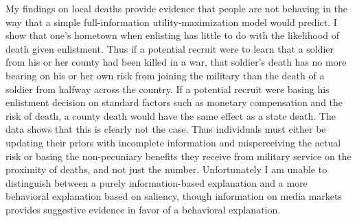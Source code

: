 \documentclass[12pt] {article}
\begin{document}


 

My findings on local deaths provide evidence that people
are not behaving in the way that a simple full-information utility-maximization
model would predict. I show that one's hometown when enlisting has
little to do with the likelihood of death given enlistment. Thus if
a potential recruit were to learn that a soldier from his or her
county had been killed in a war, that soldier's death has no more
bearing on his or her own risk from joining the military than the
death of a soldier from halfway across the country. If a potential
recruit were basing his enlistment decision on standard factors such
as monetary compensation and the risk of death, a county death would
have the same effect as a state death. The data shows that this is
clearly not the case. Thus individuals must either be updating their
priors with incomplete information and misperceiving the actual risk
or basing the non-pecuniary benefits they receive from military service
on the proximity of deaths, and not just the number. Unfortunately I am unable to distinguish between a purely information-based explanation and a more behavioral explanation based on saliency, though information on media markets provides suggestive evidence in favor of a behavioral explanation.
\end{document}
